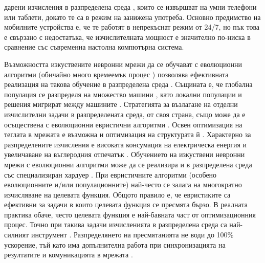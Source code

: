 дарени изчисления в разпределена среда \cite{Gong-01}, които се извършват на умни телефони или таблети, докато те са в режим на занижена употреба. Основно предимство на мобилните устройства е, че те работят в непрекъснат режим от 24/7, но пък това е свързано с недостатъка, че изчислителната мощност е значително по-ниска в сравнение със съвременна настолна компютърна система. 

Възможността изкуствените невронни мрежи да се обучават с еволюционни алгоритми (обичайно много времеемък процес \cite{Guo-01}) позволява ефективната реализация на такова обучение в разпределена среда \cite{Pandey-01}. Същината е, че глобална популация се разпределя на множество машини \cite{Plagianakos-01}, като локални популации и решения мигрират между машините \cite{Tan-01}. Стратегията за възлагане на отделни изчислителни задачи \cite{Ahmad-01} в разпределената среда, от своя страна, също може да е осъществена с еволюционни евристични алгоритми \cite{Sharma-01}. Освен оптимизация на теглата в мрежата е възможна и оптимизация на структурата й \cite{Desell-01}. Характерно за разпределените изчисления е високата консумация на електрическа енергия \cite{Foo-01} и увеличаване на въглеродния отпечатък \cite{Kumar-01}. Обучението на изкуствени невронни мрежи с еволюционни алгоритми може да се реализира и в разпределена среда със специализиран хардуер \cite{Epitropakis-01}. При евристичните алгоритми (особено еволюционните и/или популационните) най-често се залага на многократно изчисляване на целевата функция. Общото правило е, че евристиките са ефективни за задачи в които целевата функция се пресмята бързо. В реалната практика обаче, често целевата функция е най-бавната част от оптимизационния процес. Точно при такива задачи изчисленията в разпределена среда са най-силният инструмент \cite{Liu-01}. Разпределянето на пресмятанията не води до 100\% ускорение, тъй като има допълнителна работа при синхронизацията на резултатите и комуникацията в мрежата \cite{Gong-01}.

